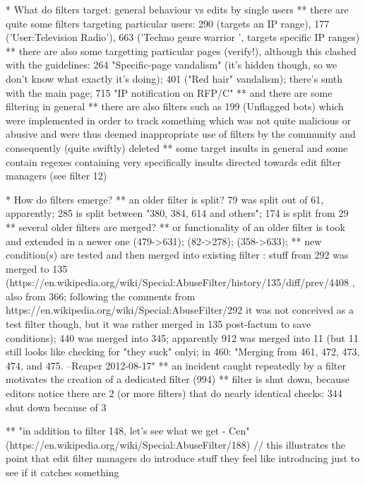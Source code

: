 * What do filters target: general behaviour vs edits by single users
  ** there are quite some filters targeting particular users: 290 (targets an IP range), 177 ('User:Television Radio'), 663 ('Techno genre warrior
', targets specific IP ranges)
  ** there are also some targetting particular pages (verify!), although this clashed with the guidelines: 264 "Specific-page vandalism" (it's hidden though, so we don't know what exactly it's doing); 401 ("Red hair" vandalism); there's smth with the main page; 715 "IP notification on RFP/C"
  ** and there are some filtering in general
  ** there are also filters such as 199 (Unflagged bots) which were implemented in order to track something which was not quite malicious or abusive and were thus deemed inappropriate use of filters by the community and consequently (quite swiftly) deleted
  ** some target insults in general and some contain regexes containing very specifically insults directed towards edit filter managers (see filter 12)

* How do filters emerge?
  ** an older filter is split? 79 was split out of 61, apparently; 285 is split between "380, 384, 614 and others"; 174 is split from 29
  ** several older filters are merged?
  ** or functionality of an older filter is took and extended in a newer one (479->631); (82->278); (358->633);
  ** new condition(s) are tested and then merged into existing filter : stuff from 292 was merged to 135 (https://en.wikipedia.org/wiki/Special:AbuseFilter/history/135/diff/prev/4408 , also from 366; following the comments from https://en.wikipedia.org/wiki/Special:AbuseFilter/292 it was not conceived as a test filter though, but it was rather merged in 135 post-factum to save conditions); 440 was merged into 345; apparently 912 was merged into 11 (but 11 still looks like checking for "they suck" only^^); in 460: "Merging from 461, 472, 473, 474, and 475. --Reaper 2012-08-17"
  ** an incident caught repeatedly by a filter motivates the creation of a dedicated filter (994)
  ** filter is shut down, because editors notice there are 2 (or more filters) that do nearly identical checks: 344 shut down because of 3

  ** "in addition to filter 148, let's see what we get - Cen" (https://en.wikipedia.org/wiki/Special:AbuseFilter/188) // this illustrates the point that edit filter managers do introduce stuff they feel like introducing just to see if it catches something

\begin{comment}
    \item is it new filters that get triggered most frequently? or are there also very active old ones? -- we have the most active filters per year, where we can observe this. It's a mixture of older and newer filter IDs (they get an incremental ID, so it is somewhat obvious what's older and what's newer); is there a tendency to split and refine older filters?
    \item how many different edit filter editors are there (af\_user)?
\end{comment}

